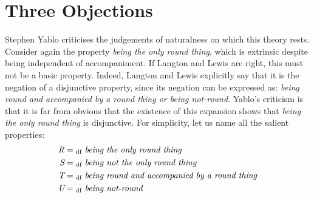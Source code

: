 \section{Three Objections}
Stephen Yablo \citep{Yablo1993} criticises the judgements of naturalness on which this theory rests. Consider again the property \textit{being the only round thing}, which is extrinsic despite being independent of accompaniment. If Langton and Lewis are right, this must not be a basic property. Indeed, Langton and Lewis explicitly say that it is the negation of a disjunctive property, since its negation can be expressed as: \textit{being round and accompanied by a round thing or being not\nobreakdash-round}. Yablo's criticism is that it is far from obvious that the existence of this expansion shows that \textit{being the only round thing} is disjunctive. For simplicity, let us name all the salient properties:
\begin{align}
\textit{R}&=\textsubscript{df}~\textit{being the only round thing} \\
\textit{S}&=\textsubscript{df}~\textit{being not the only round thing}\\
\textit{T}&=\textsubscript{df}~\textit{being round and accompanied by a round thing}\\
\textit{U}&=\textsubscript{df}~\textit{being not\nobreakdash-round}
\end{align}

